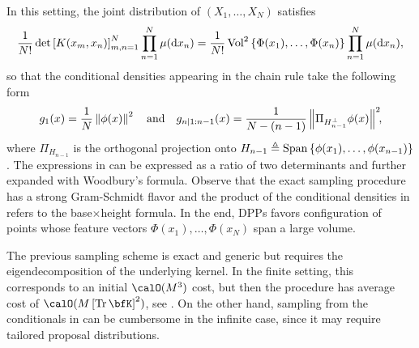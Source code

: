 \documentclass[twoside,11pt]{article}
\begin{document}
      In this setting, the joint distribution of $(X_1,\dots,X_N)$ satisfies
      \begin{equation}
      \label{eq:joint_distribution}
        \frac{1}{N!} \det \left[ K(x_m,x_n) \right]_{m,n=1}^N \prod_{n=1}^N\mu(\mathop{}\!\mathrm{d} x_n)
          = \frac{1}{N!} \operatorname{Vol}^2\left\{ \Phi(x_1),\dots,\Phi(x_n) \right\} \prod_{n=1}^N\mu(\mathop{}\!\mathrm{d} x_n),
      \end{equation}
\noindent
      so that the conditional densities appearing in the chain rule take the following form
      \begin{equation}
      \label{eq:conditionals_densities}
        g_1(x)
          = \frac{1}{N} \left\| \phi(x) \right\|^2
          \quad\text{and}\quad
        g_{n | 1:n-1}(x)
          = \frac{1}{N-(n-1)} \left\|  \Pi_{H_{n-1}^{\perp}} \phi(x) \right\|^2\!\!,
      \end{equation}
      where $\Pi_{H_{n-1}}$ is the orthogonal projection onto
      $H_{n-1} \triangleq \operatorname{Span}\left\{ \phi(x_1), \dots, \phi(x_{n-1})  \right\}$.
      The expressions in  can be expressed as a ratio of two determinants and further expanded with Woodbury's formula.
      Observe that the exact sampling procedure has a strong Gram-Schmidt flavor and the product of the conditional densities in  refers to the base$\times$height formula.
      In the end, DPPs favors configuration of points whose feature vectors $\Phi(x_1),\dots, \Phi(x_N)$ span a large volume.

      The previous sampling scheme is exact and generic but requires the eigendecomposition of the underlying kernel.
      In the finite setting, this corresponds to an initial $\calO(M^3)$ cost, but then the procedure has average cost of $\calO(M\lrb{\Tr \bfK}^2)$,
      see \citet{TrBaAm18}.
      On the other hand, sampling from the conditionals in  can be cumbersome in the infinite case, since it may require tailored proposal distributions.
\end{document}
